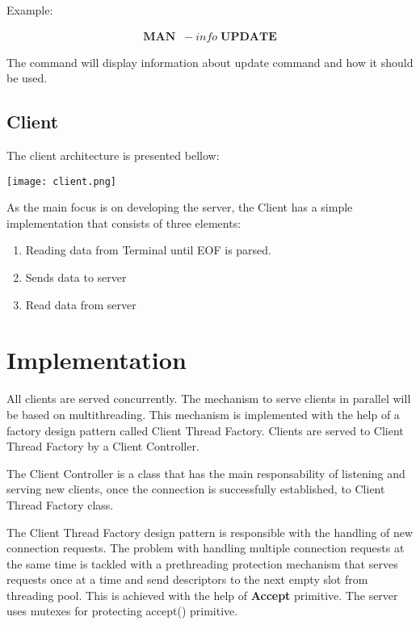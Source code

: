 \documentclass[runningheads]{llncs}
\begin{document}
Example:

\begin{gather*}
    \textbf{MAN} \;\;-info \; \textbf{UPDATE}
\end{gather*}

The command will display information about update command and how it should be used.

\subsection{Client}
The client architecture is presented bellow:

\vspace{5mm}
\texttt{[image: client.png]}
\vspace{5mm}

As the main focus is on developing the server, the Client has a simple implementation that consists of three elements:
\begin{enumerate}
    \item Reading data from Terminal until EOF is parsed.
    \item Sends data to server
    \item Read data from server
\end{enumerate}

\section{Implementation}

All clients are served concurrently. The mechanism to serve clients in parallel will be based on multithreading.
This mechanism is implemented with the help of a factory design pattern called Client Thread Factory. Clients are served to Client Thread Factory by a Client Controller.

The Client Controller is a class that has the main responsability of listening and serving new clients, once the connection is successfully established, to Client Thread Factory class.

The Client Thread Factory design pattern is responsible with the handling of new connection requests. The problem with handling multiple connection requests at the same time is tackled with a prethreading protection mechanism that serves requests once at a time and send descriptors to the next empty slot from threading pool. This is achieved with the help of \textbf{Accept} primitive. The server uses mutexes for protecting accept() primitive.
\end{document}
